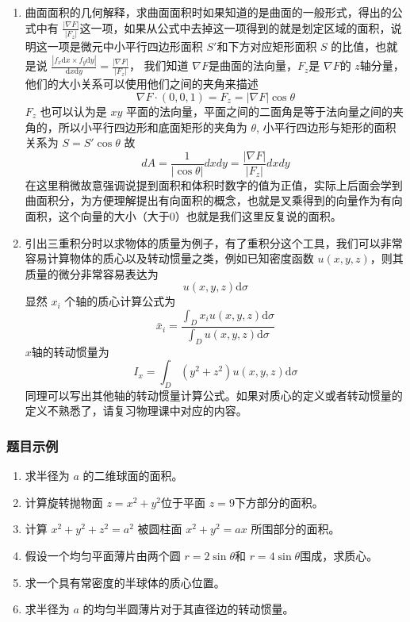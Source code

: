 \begin{enumerate}
    \item 曲面面积的几何解释，求曲面面积时如果知道的是曲面的一般形式，得出的公式中有 $\frac{|\nabla F|}{|F_z|}$这一项，如果从公式中去掉这一项得到的就是划定区域的面积，说明这一项是微元中小平行四边形面积 $S'$和下方对应矩形面积 $S$ 的比值，也就是说 $\frac{|f_x \mathrm{d} x \times f_y \mathrm{d}y| }{\mathrm{d} x \mathrm{d}y} = \frac{|\nabla F|}{|F_z|}$， 我们知道 $\nabla F$是曲面的法向量，$F_z$是 $\nabla F$的 $z$轴分量，他们的大小关系可以使用他们之间的夹角来描述
    $$
    \nabla F\cdot(0,0,1)=F_z=|\nabla F|\cos\theta
    $$
    $F_z$ 也可以认为是 $xy$ 平面的法向量，平面之间的二面角是等于法向量之间的夹角的，所以小平行四边形和底面矩形的夹角为 $\theta$, 小平行四边形与矩形的面积关系为 $S = S' \cos \theta$
    故
    $$
    dA=\frac{1}{|\cos\theta|}dxdy=\frac{|\nabla F|}{|F_z|}dxdy
    $$
    在这里稍微故意强调说提到面积和体积时数字的值为正值，实际上后面会学到曲面积分，为方便理解提出有向面积的概念，也就是叉乘得到的向量作为有向面积，这个向量的大小（大于0）也就是我们这里反复说的面积。

    \item 引出三重积分时以求物体的质量为例子，有了重积分这个工具，我们可以非常容易计算物体的质心以及转动惯量之类，例如已知密度函数 $u(x,y,z)$，则其质量的微分非常容易表达为
    $$
    u(x,y,z) \mathrm{d}\sigma
    $$
    显然 $x_i$ 个轴的质心计算公式为
    $$
    \bar{x}_i = \frac{\int _ D x_i u(x,y,z) \mathrm{d}\sigma}{\int _D u(x,y,z) \mathrm{d}\sigma}
    $$
    $x$轴的转动惯量为
    $$
    I_x = \int _D (y^2 + z^2) u(x,y,z) \mathrm{d}\sigma
    $$
    同理可以写出其他轴的转动惯量计算公式。如果对质心的定义或者转动惯量的定义不熟悉了，请复习物理课中对应的内容。
\end{enumerate}

\subsubsection{题目示例}
\begin{enumerate}
    \item 求半径为 $a$ 的二维球面的面积。

    \item 计算旋转抛物面 $z = x^2 + y^2$位于平面 $z=9$下方部分的面积。

    \item 计算 $x^2 + y^2 + z^2 =a^2$ 被圆柱面 $x^2 + y^2 = ax$ 所围部分的面积。

    \item 假设一个均匀平面薄片由两个圆 $r=2\sin \theta$和 $r = 4\sin \theta$围成，求质心。

    \item 求一个具有常密度的半球体的质心位置。

    \item 求半径为 $a$ 的均匀半圆薄片对于其直径边的转动惯量。
\end{enumerate}

